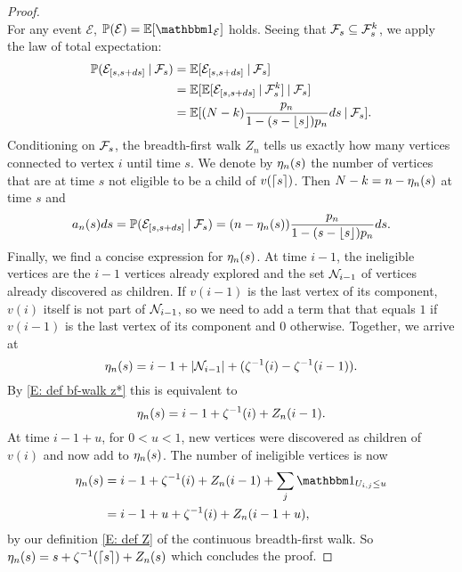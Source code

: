 \begin{proof}
\begin{equation}
	\end{equation}
	For any event $\mathcal{E}$,
	$\Prob(\mathcal{E}) = \Exp{\Ind{\mathcal{E}}}$ holds.
	Seeing that $\SigmaAlgebra_s \subseteq \SigmaAlgebra_s^k$,
	we apply the law of total expectation:
	\begin{equation}
	\begin{aligned}
	\Prob(\NewEdge{[s,s+ds]} \cond \SigmaAlgebra_s)
	&= \Exp{\NewEdge{[s,s+ds]} \cond \SigmaAlgebra_s} \\
	&= \Exp{ \Exp{\NewEdge{[s,s+ds]} \cond \SigmaAlgebra_s^k} \cond \SigmaAlgebra_s} \\
	&= \Exp{ (N-k) \ps ds \cond \SigmaAlgebra_s}.
	\end{aligned}
	\end{equation}
	Conditioning on $\SigmaAlgebra_s$,
	the breadth-first walk $Z_n$ tells us exactly how many vertices connected to vertex $i$ until time $s$.
	We denote by $\Ineligible{s}$ the number of vertices that are at time $s$ not eligible to be a child of $v(\ceil{s})$.
	Then $N-k=n-\Ineligible{s}$ at time $s$ and
	\begin{equation}
	\an{s}ds = \Prob(\NewEdge{\sds} \cond \SigmaAlgebra_s) = (n - \Ineligible{s}) \ps ds.
	\end{equation}
	Finally, we find a concise expression for $\Ineligible{s}$.
	At time $i-1$, the ineligible vertices are the $i-1$ vertices already explored
	and the set $\Ni{i-1}$ of vertices already discovered as children.
	If $v(i-1)$ is the last vertex of its component,
	$v(i)$ itself is not part of $\Ni{i-1}$, 
	so we need to add a term that that equals $1$ if $v(i-1)$ is the last vertex of its component and $0$ otherwise.
	Together, we arrive at
	\begin{equation}
	\Ineligible{i-1} = i-1 + |\Ni{i-1}| + (\ZetaMinus{i} - \ZetaMinus{i-1}).
	\end{equation}
	By \eqref{E: def bf-walk z*} this is equivalent to
	\begin{equation}
	\Ineligible{i-1} = i-1 + \ZetaMinus{i} + \Zn{i-1}.
	\end{equation}
	At time $i-1+u$, for $0<u<1$, 
	new vertices were discovered as children of $v(i)$ and now add to $\Ineligible{i-1+u}$.
	The number of ineligible vertices is now
	\begin{equation}
	\begin{aligned}
	\Ineligible{i-1+u} 
	&= i-1 + \ZetaMinus{i} + \Zn{i-1} + \sum_{j} \Ind{\Uij \leq u} \\
	&= i-1+u + \ZetaMinus{i} + \Zn{i-1+u},
	\end{aligned}
	\end{equation} 
	by our definition \eqref{E: def Z} of the continuous breadth-first walk.
	So $\Ineligible{s} = s + \ZetaMinus{\ceil{s}} + \Zn{s}$ which concludes the proof.
\end{proof}


